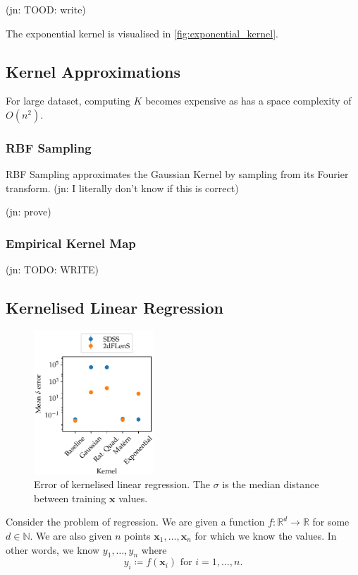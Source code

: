 \documentclass[11pt,twoside]{report}
\newcommand\bx{\mathbf{x}}
\newcommand\bbN{\mathbb{N}}
\newcommand\bbR{\mathbb{R}}
\newcommand\jn[1]{{\color{red}(jn: #1)}}
\begin{document}
\jn{TOOD: write}

The exponential kernel is visualised in \cref{fig:exponential_kernel}.

\subsection{Kernel Approximations}

For large dataset, computing $K$ becomes expensive as has a space complexity of $O(n^2)$.

\subsubsection{RBF Sampling}

RBF Sampling approximates the Gaussian Kernel by sampling from its Fourier transform. \jn{I literally don't know if this is correct}

\jn{prove}

\subsubsection{Empirical Kernel Map}

\jn{TODO: WRITE}


\subsection{Kernelised Linear Regression}

  \begin{figure}
    \centering
    \includegraphics[width=0.4\textwidth]{linreg_kernelised.pdf}
    \caption{Error of kernelised linear regression. The $\sigma$ is the median distance between training $\bx$ values.}
    \label{fig:linreg_kernelised}
  \end{figure}

Consider the problem of regression. We are given a function $f : \bbR^d \to \bbR$ for some $d \in \bbN$. We are also given $n$ points $\bx_1, \dots, \bx_n$ for which we know the values. In other words, we know $y_1, \dots, y_n$ where \[
    y_i \coloneqq f(\bx_i)\text{ for }i = 1, \dots, n\text{.}
\]
\end{document}
